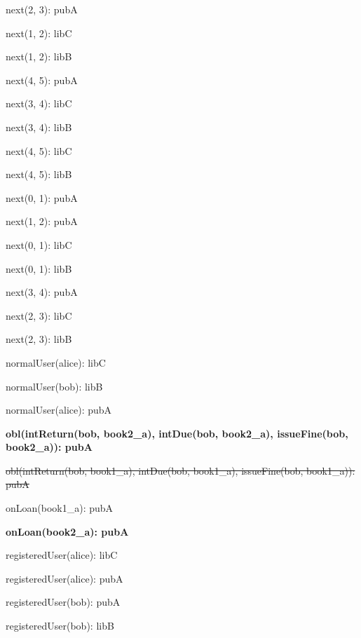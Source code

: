 \documentclass{article}
\newenvironment{states}
        {\begin{minipage}{\tableWidth}\raggedright\begin{description}[align=left,leftmargin=1em,noitemsep,labelsep=\parindent]}
        {\end{description}\end{minipage}}
\begin{document}
{\begin{states}
\item{{next(\allowbreak{}2, 3): pubA}}
\item{{next(\allowbreak{}1, 2): libC}}
\item{{next(\allowbreak{}1, 2): libB}}
\item{{next(\allowbreak{}4, 5): pubA}}
\item{{next(\allowbreak{}3, 4): libC}}
\item{{next(\allowbreak{}3, 4): libB}}
\item{{next(\allowbreak{}4, 5): libC}}
\item{{next(\allowbreak{}4, 5): libB}}
\item{{next(\allowbreak{}0, 1): pubA}}
\item{{next(\allowbreak{}1, 2): pubA}}
\item{{next(\allowbreak{}0, 1): libC}}
\item{{next(\allowbreak{}0, 1): libB}}
\item{{next(\allowbreak{}3, 4): pubA}}
\item{{next(\allowbreak{}2, 3): libC}}
\item{{next(\allowbreak{}2, 3): libB}}
\item{{normalUser(\allowbreak{}alice): libC}}
\item{{normalUser(\allowbreak{}bob): libB}}
\item{{normalUser(\allowbreak{}alice): pubA}}
\item\textbf{{obl(\allowbreak{}intReturn(\allowbreak{}bob, book2\_a), intDue(\allowbreak{}bob, book2\_a), issueFine(\allowbreak{}bob, book2\_a)): pubA}}
\item{\sout{obl(\allowbreak{}intReturn(\allowbreak{}bob, book1\_a), intDue(\allowbreak{}bob, book1\_a), issueFine(\allowbreak{}bob, book1\_a)): pubA}}
\item{{onLoan(\allowbreak{}book1\_a): pubA}}
\item\textbf{{onLoan(\allowbreak{}book2\_a): pubA}}
\item{{registeredUser(\allowbreak{}alice): libC}}
\item{{registeredUser(\allowbreak{}alice): pubA}}
\item{{registeredUser(\allowbreak{}bob): pubA}}
\item{{registeredUser(\allowbreak{}bob): libB}}
\end{states}}
\end{document}
